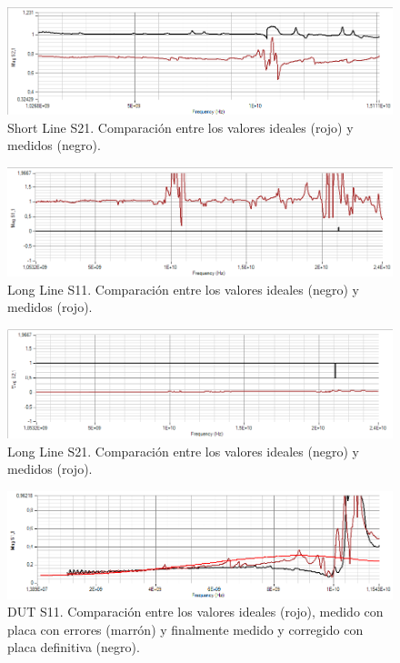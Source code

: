 \documentclass[10pt, a4paper, twocolumn]{article}
\begin{document}
\begin{figure}[hbt!]
	\includegraphics[width=\linewidth]{Fotos/Mediciones/L1_S21.PNG}
	\caption{Short Line S21. Comparación entre los valores ideales (rojo) y medidos (negro).}
\end{figure}

\begin{figure}[hbt!]
	\includegraphics[width=\linewidth]{Fotos/Mediciones/L2_S11.PNG}
	\caption{Long Line S11. Comparación entre los valores ideales (negro) y medidos (rojo).}
\end{figure}

\begin{figure}[hbt!]
	\includegraphics[width=\linewidth]{Fotos/Mediciones/L2_S21.PNG}
	\caption{Long Line S21. Comparación entre los valores ideales (negro) y medidos (rojo).}
\end{figure}

\begin{figure}[hbt!]
	\includegraphics[width=\linewidth]{Fotos/Mediciones/DUT_S11.PNG}
	\caption{DUT S11. Comparación entre los valores ideales (rojo), medido con placa con errores (marrón)
	y finalmente medido y corregido con placa definitiva (negro).}
\end{figure}
\end{document}
